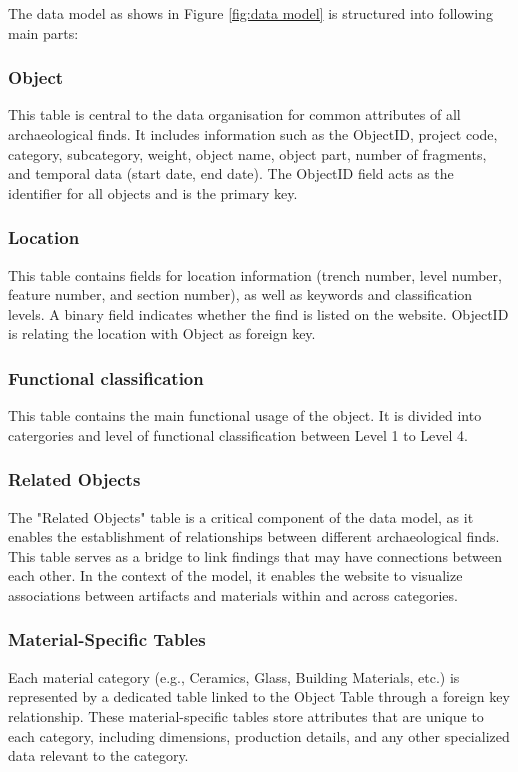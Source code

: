 The data model as shows in Figure \ref{fig:data model} is structured into following main parts:

\subsubsection{Object}
This table is central to the data organisation for common attributes of all archaeological finds. It includes information such as the ObjectID, project code, category, subcategory, weight, object name, object part, number of fragments, and temporal data (start date, end date). The ObjectID field acts as the identifier for all objects and is the primary key.

\subsubsection{Location}
This table contains fields for location information (trench number, level number, feature number, and section number), as well as keywords and classification levels. A binary field indicates whether the find is listed on the website. ObjectID is relating the location with Object as foreign key.

\subsubsection{Functional classification}
This table contains the main functional usage of the object. It is divided into catergories and level of functional classification between Level 1 to Level 4.

\subsubsection{Related Objects}
The "Related Objects" table is a critical component of the data model, as it enables the establishment of relationships between different archaeological finds. This table serves as a bridge to link findings that may have connections between each other. In the context of the model, it enables the website to visualize associations between artifacts and materials within and across categories.

\subsubsection{Material-Specific Tables}
Each material category (e.g., Ceramics, Glass, Building Materials, etc.) is represented by a dedicated table linked to the Object Table through a foreign key relationship. These material-specific tables store attributes that are unique to each category, including dimensions, production details, and any other specialized data relevant to the category.

